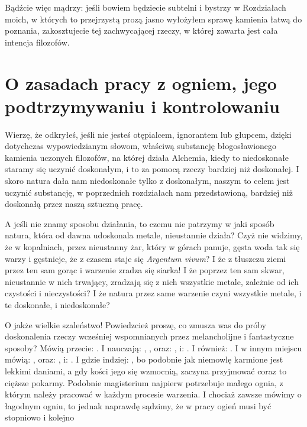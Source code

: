 Bądźcie więc mądrzy: jeśli bowiem będziecie subtelni i bystrzy w Rozdziałach moich, w których to przejrzystą prozą jasno wyłożyłem sprawę kamienia łatwą do poznania, zakosztujecie tej zachwycającej rzeczy, w której zawarta jest cała intencja filozofów.

\section{O zasadach pracy z ogniem, jego podtrzymywaniu i kontrolowaniu}

Wierzę, że odkryłeś, jeśli nie jesteś otępialcem, ignorantem lub głupcem, dzięki dotychczas wypowiedzianym słowom, właściwą substancję błogosławionego kamienia uczonych filozofów, na której działa Alchemia, kiedy to niedoskonałe staramy się uczynić doskonałym, i to za pomocą rzeczy bardziej niż doskonałej. I skoro natura dała nam niedoskonałe tylko z doskonałym, naszym to celem jest uczynić substancję, w poprzednich rozdziałach nam przedstawioną, bardziej niż doskonałą przez naszą sztuczną pracę. 

A jeśli nie znamy sposobu działania, to czemu nie patrzymy w jaki sposób natura, która od dawna udoskonala metale, nieustannie działa? Czyż nie widzimy, że w kopalniach, przez nieustanny żar, który w górach panuje, gęsta woda tak się warzy i gęstnieje, że z czasem staje się \textit{Argentum vivum}? I że z tłuszczu ziemi przez  ten sam gorąc i warzenie zradza się siarka! I że poprzez ten sam skwar, nieustannie w nich trwający, zradzają się z nich wszystkie metale, zależnie od ich czystości i nieczystości? I że natura przez same warzenie czyni wszystkie metale, i te doskonałe, i niedoskonałe?

O jakże wielkie szaleństwo! Powiedzcież proszę, co zmusza was do próby doskonalenia rzeczy wcześniej wspomnianych przez melancholijne i fantastyczne sposoby? Mówią przecie: . I nauczają: , , oraz: , i: . I również: . I w innym miejscu mówią: , oraz: , i: . I gdzie indziej: , bo podobnie jak niemowlę karmione jest lekkimi daniami, a gdy kości jego się wzmocnią, zaczyna przyjmować coraz to cięższe pokarmy. Podobnie magisterium najpierw potrzebuje małego ognia, z którym należy pracować w każdym procesie warzenia. I chociaż zawsze mówimy o łagodnym ogniu, to jednak naprawdę sądzimy, że w pracy ogień musi być stopniowo i kolejno 


